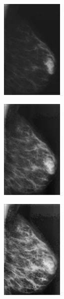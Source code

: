 \documentclass[spanish,twocolumn]{article}
\begin{document}
{\begin{minipage}[b]{1.0\linewidth}
   \begin{minipage}[t]{0.3\linewidth}  
   		\centering
        \includegraphics[width=3cm]{Figures/3715982_IJMPO-34-47-g001.png}
  	\end{minipage}
  \hspace{1pt}
   \begin{minipage}[t]{0.3\linewidth}  
   		\centering
        \includegraphics[width=3cm]{Figures/11608-3715982_IJMPO-34-47-g001.png}
  	\end{minipage}
   \begin{minipage}[t]{0.3\linewidth}  
   		\centering
        \includegraphics[width=3cm]{Figures/11806-3715982_IJMPO-34-47-g001.png}
  	\end{minipage}
  \vspace{0.5cm}
    \label{fig:resultado2}


\end{minipage}}
\end{document}
